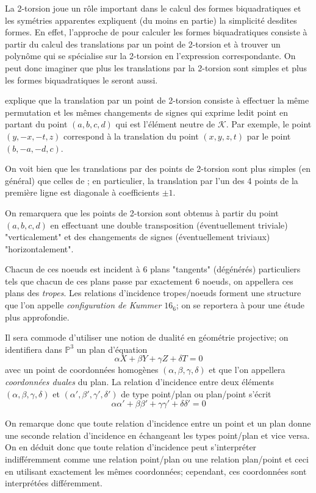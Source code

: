 \documentclass[a4paper]{article}
\theoremstyle{definition}
\theoremstyle{remark}
\numberwithin{equation}{section}
\begin{document}
La 2-torsion joue un rôle important dans le calcul des formes biquadratiques et les symétries apparentes expliquent (du moins en partie) la simplicité desdites formes. 
En effet, l'approche de \citet{cassels-Flynn} pour calculer les formes biquadratiques consiste à partir du calcul des translations par un point de 2-torsion et à trouver un polynôme qui se spécialise sur la 2-torsion en l'expression correspondante.
On peut donc imaginer que plus les translations par la 2-torsion sont simples et plus les formes biquadratiques le seront aussi.

\citet{gaudry} explique que la translation par un point de 2-torsion consiste à effectuer la même permutation et les mêmes changements de signes qui exprime ledit point en partant du point $(a,b,c,d)$ qui est l'élément neutre de $\mathcal{K}$. Par exemple, le point $(y,-x,-t,z)$ correspond à la translation du point $(x,y,z,t)$ par le point $(b,-a,-d,c)$.

On voit bien que les translations par des points de 2-torsion sont plus simples (en général) que celles de \citet{eqKum}; en particulier, la translation par l'un des 4 points de la première ligne est diagonale à coefficients $\pm 1$.

On remarquera que les points de 2-torsion sont obtenus à partir du point $(a,b,c,d)$ en effectuant une double transposition (éventuellement triviale) "verticalement" et des changements de signes (éventuellement triviaux) "horizontalement".

Chacun de ces noeuds est incident à 6 plans "tangents" (dégénérés) particuliers tels que chacun de ces plans passe par exactement 6 noeuds, on appellera ces plans des \emph{tropes}. Les relations d'incidence tropes/noeuds forment une structure que l'on appelle \emph{configuration de Kummer} $16_6$; on se reportera à \citep{hudson} pour une étude plus approfondie.

Il sera commode d'utiliser une notion de dualité en géométrie projective; on identifiera dans $\mathbb{P}^3$ un plan d'équation $$\alpha X + \beta Y + \gamma Z + \delta T = 0$$ avec un point de coordonnées homogènes $(\alpha, \beta, \gamma, \delta)$ et que l'on appellera \emph{coordonnées duales} du plan. La relation d'incidence entre deux éléments $(\alpha, \beta, \gamma, \delta)$ et $(\alpha', \beta', \gamma', \delta')$ de type point/plan ou plan/point s'écrit
$$\alpha\alpha' + \beta\beta' + \gamma\gamma' + \delta\delta' = 0$$

On remarque donc que toute relation d'incidence entre un point et un plan donne une seconde relation d'incidence en échangeant les types point/plan et vice versa. On en déduit donc que toute relation d'incidence peut s'interpréter indifféremment comme une relation point/plan ou une relation plan/point et ceci en utilisant exactement les mêmes coordonnées; cependant, ces coordonnées sont interprétées différemment.
\end{document}
